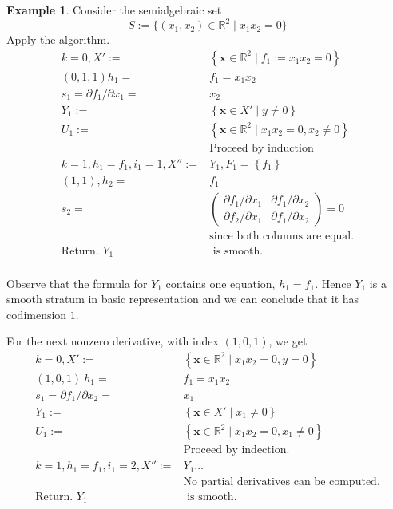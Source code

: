 \documentclass[
]{book}
\theoremstyle{definition}
\theoremstyle{definition}
\newtheorem{example}{Example}[chapter]
\theoremstyle{definition}
\theoremstyle{definition}
\theoremstyle{remark}
\begin{document}
\begin{example}
Consider the semialgebraic set
\[
S := \{ (x_1,x_2) \in \mathbb{R}^2 \mid x_1 x_2 = 0 \}
\]
Apply the algorithm.
\begin{align*}
k=0,X':=&\left\{ \mathbf{x}\in\mathbb{R}^{2}\mid f_{1}:=x_{1}x_{2}=0\right\} \\\left(0,1,1\right)h_{1}=&f_{1}=x_{1}x_{2}\\s_{1}=\partial f_{1}/\partial x_{1}=&x_{2}\\Y_{1}:=&\left\{ \mathbf{x}\in X'\mid y\ne0\right\} \\U_{1}:=&\left\{ \mathbf{x}\in \mathbb{R}^2\mid x_{1}x_{2}=0,x_{2}\ne0\right\} \\&\text{Proceed by induction}\\k=1,h_{1}=f_{1},i_{1}=1,X'':=&Y_{1},F_{1}=\left\{ f_{1}\right\} \\\left(1,1\right),h_{2}=&f_{1}\\s_{2}=&\begin{pmatrix}\partial f_{1}/\partial x_{1} & \partial f_{1}/\partial x_{2}\\
\partial f_{2}/\partial x_{1} & \partial f_{1}/\partial x_{2}
\end{pmatrix}=0\\&\text{since both columns are equal.}\\\text{Return. }Y_{1}&\text{ is smooth.}\\
\end{align*}

Observe that the formula for \(Y_1\) contains one equation, \(h_1 = f_1\). Hence \(Y_1\) is a smooth stratum in basic representation and we can conclude that it has codimension \(1\).

For the next nonzero derivative, with index \((1,0,1)\), we get
\begin{align*}
k=0,X':=&\left\{ \mathbf{x}\in\mathbb{R}^{2}\mid x_{1}x_{2}=0,y=0\right\} \\\left(1,0,1\right)\ h_{1}=&f_{1}=x_{1}x_{2}\\s_{1}=\partial f_{1}/\partial x_{2}=&x_{1}\\Y_{1}:=&\left\{ \mathbf{x}\in X'\mid x_{1}\ne0\right\} \\U_{1}:=&\left\{ \mathbf{x}\in\mathbb{R}^{2}\mid x_{1}x_{2}=0,x_{1}\ne0\right\} \\&\text{Proceed by indection.}\\k=1,h_{1}=f_{1},i_{1}=2,X'':=&Y_{1}\ldots\\&\text{No partial derivatives can be computed.}\\\text{Return. }Y_{1}&\text{ is smooth.}
\end{align*}


\end{example}
\end{document}
